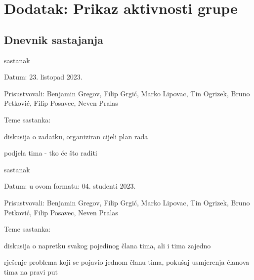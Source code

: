 \chapter*{Dodatak: Prikaz aktivnosti grupe}
		
		\section*{Dnevnik sastajanja}
		
		\begin{packed_enum}
			\item  sastanak
			
			\item[] \begin{packed_item}
				\item Datum: 23. listopad 2023.
				\item Prisustvovali: Benjamin Gregov, Filip Grgić, Marko Lipovac, Tin Ogrizek, Bruno Petković, Filip Posavec, Neven Pralas
				\item Teme sastanka:
				\begin{packed_item}
					\item  diskusija o zadatku, organiziran cijeli plan rada
					\item  podjela tima - tko će što raditi
				\end{packed_item}
			\end{packed_item}
			
			\item  sastanak
			\item[] \begin{packed_item}
				\item Datum: u ovom formatu: 04. studenti 2023.
				\item Prisustvovali: Benjamin Gregov, Filip Grgić, Marko Lipovac, Tin Ogrizek, Bruno Petković, Filip Posavec, Neven Pralas
				\item Teme sastanka:
				\begin{packed_item}
					\item  diskusija o napretku svakog pojedinog člana tima, ali i tima zajedno
					\item  rješenje problema koji se pojavio jednom članu tima, pokušaj usmjerenja članova tima na pravi put
				\end{packed_item}
			\end{packed_item}
			

\end{packed_enum}
